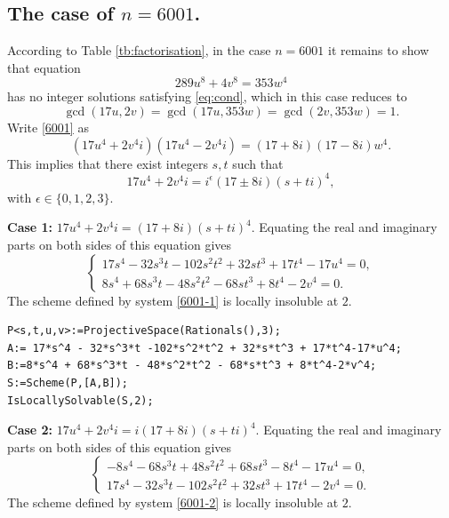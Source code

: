 \documentclass[a4paper,12pt,english,reqno]{amsart}
\begin{document}
\subsection{The case of $n=6001$.}%
According to Table \ref{tb:factorisation}, in the case $n=6001$ it remains to
show that equation
\begin{equation}\label{6001}
289 u^8+4 v^8=353  w^4
\end{equation}
has no integer solutions satisfying \eqref{eq:cond}, which in this case reduces to \[\gcd(17u,2v)=\gcd(17u,353w)=\gcd(2v,353w)=1.\] Write \eqref{6001} as
\begin{equation} (17u^4+2v^4i)(17u^4-2v^4i)=(17+8i)(17-8i)w^4.
\end{equation}
This implies that there exist integers $s,t$ such that 
\[17u^4+2v^4i=i^{\epsilon}(17\pm 8i)(s+ti)^4,\]
with $\epsilon \in \{0,1,2,3\}$.


{\bf Case 1:} $17u^4+2v^4i=(17+8i)(s+ti)^4$. Equating the real and imaginary parts on both sides of this equation gives
\begin{equation}\label{6001-1}
\begin{cases}
17s^4 - 32s^3t - 102s^2t^2 + 32st^3 + 17t^4 - 17u^4=0,\\
8s^4 + 68s^3t - 48s^2t^2 - 68st^3 + 8t^4 - 2v^4=0.
\end{cases}
\end{equation}
The scheme defined by system \eqref{6001-1} is locally insoluble at $2$.

\begin{lstlisting}
P<s,t,u,v>:=ProjectiveSpace(Rationals(),3);
A:= 17*s^4 - 32*s^3*t -102*s^2*t^2 + 32*s*t^3 + 17*t^4-17*u^4;
B:=8*s^4 + 68*s^3*t - 48*s^2*t^2 - 68*s*t^3 + 8*t^4-2*v^4;
S:=Scheme(P,[A,B]);
IsLocallySolvable(S,2);
\end{lstlisting}

{\bf Case 2:} $17u^4+2v^4i=i(17+8i)(s+ti)^4$. Equating the real and imaginary parts on both sides of this equation gives
\begin{equation}\label{6001-2}
\begin{cases}
-8s^4 - 68s^3t + 48s^2t^2 + 68st^3 - 8t^4 - 17u^4=0,\\
17s^4 - 32s^3t - 102s^2t^2 + 32st^3 + 17t^4 - 2v^4=0.
\end{cases}
\end{equation}
The scheme defined by system \eqref{6001-2} is locally insoluble at $2$.
\end{document}
